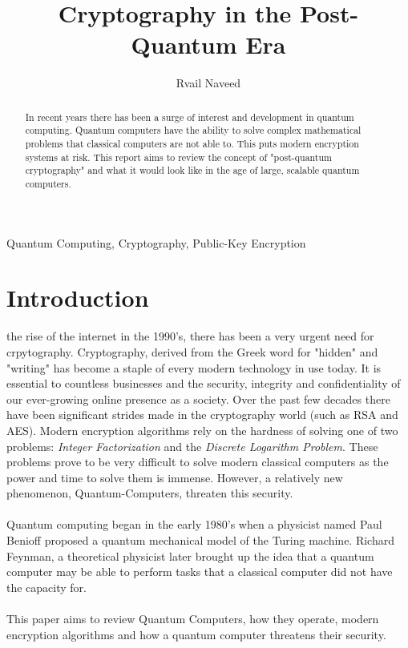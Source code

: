\documentclass[journal]{IEEEtran}
\begin{document}
\title{Cryptography in the Post-Quantum Era}


\author{Rvail Naveed}

\maketitle


\begin{abstract} %
In recent years there has been a surge of interest and development in quantum computing.
Quantum computers have the ability to solve complex mathematical problems that classical computers are not able to.
This puts modern encryption systems at risk. This report aims to review the concept of "post-quantum cryptography" and what it would look like in the age of
large, scalable quantum computers.
\end{abstract}

\begin{IEEEkeywords}
Quantum Computing, Cryptography, Public-Key Encryption
\end{IEEEkeywords}


\section{Introduction}

 the rise of the internet in the 1990's, there has been a very urgent need
for crpytography. Cryptography, derived from the Greek word for "hidden" and "writing" has become a staple
of every modern technology in use today. It is essential to countless businesses and the security, integrity 
and confidentiality of our ever-growing online presence as a society. Over the past few decades there have been 
significant strides made in the cryptography world (such as RSA and AES). Modern encryption algorithms rely on the
hardness of solving one of two problems: \emph{Integer Factorization} and the \emph{Discrete Logarithm Problem}.
These problems prove to be very difficult to solve modern classical computers as the power and time to solve them is immense.
However, a relatively new phenomenon, Quantum-Computers, threaten this security. \\ \\
Quantum computing began in the early 1980's when a physicist named Paul Benioff proposed a quantum mechanical model
of the Turing machine. Richard Feynman, a theoretical physicist later brought up the idea that a quantum
computer may be able to perform tasks that a classical computer did not have the capacity for. 
\\ \\
This paper aims to review Quantum Computers, how they operate, modern encryption algorithms and how a quantum computer
threatens their security. 
\end{document}
